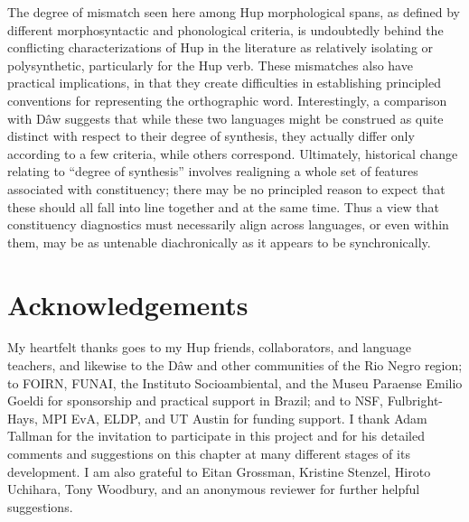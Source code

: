 \documentclass[output=paper]{langscibook}
\begin{document}
The degree of mismatch seen here among Hup morphological spans, as defined by different morphosyntactic and phonological criteria, is undoubtedly behind the conflicting characterizations of Hup in the literature as relatively isolating or polysynthetic, particularly for the Hup verb. These mismatches also have practical implications, in that they create difficulties in establishing principled conventions for representing the orthographic word. Interestingly, a comparison with Dâw suggests that while these two languages might be construed as quite distinct with respect to their degree of synthesis, they actually differ only according to a few criteria, while others correspond. Ultimately, historical change relating to ``degree of synthesis'' involves realigning a whole set of features associated with constituency; there may be no principled reason to expect that these should all fall into line together and at the same time. Thus a view that constituency diagnostics must necessarily align across languages, or even within them, may be as untenable diachronically as it appears to be synchronically.

\section*{Acknowledgements}
My heartfelt thanks goes to my Hup friends, collaborators, and language teachers, and likewise to the Dâw and other communities of the Rio Negro region; to FOIRN, FUNAI, the Instituto Socioambiental, and the Museu Paraense Emilio Goeldi for sponsorship and practical support in Brazil; and to NSF, Fulbright-Hays, MPI EvA, ELDP, and UT Austin for funding support. I thank Adam Tallman for the invitation to participate in this project and for his detailed comments and suggestions on this chapter at many different stages of its development. I am also grateful to Eitan Grossman, Kristine Stenzel, Hiroto Uchihara, Tony Woodbury, and an anonymous reviewer for further helpful suggestions.

\printglossary

\sloppy\printbibliography[heading=subbibliography,notkeyword=this]
\end{document}
